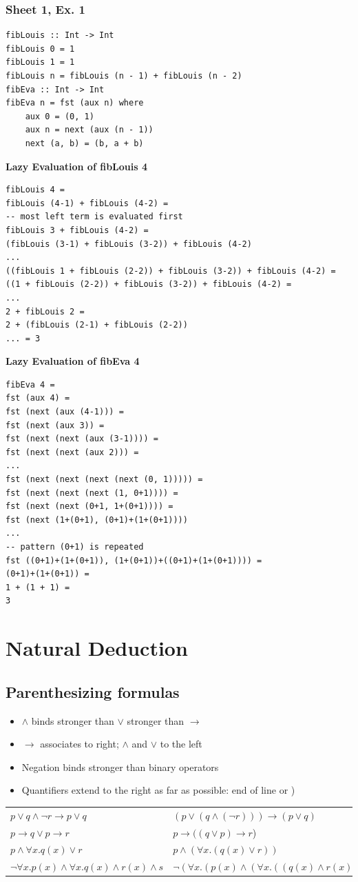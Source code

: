 \documentclass{article}
\def\li{\rightarrow}
\def\fax{\forall x.}
\begin{document}
\subsubsection{Sheet 1, Ex. 1}
\begin{verbatim}
fibLouis :: Int -> Int
fibLouis 0 = 1
fibLouis 1 = 1
fibLouis n = fibLouis (n - 1) + fibLouis (n - 2)
fibEva :: Int -> Int
fibEva n = fst (aux n) where 
    aux 0 = (0, 1)
    aux n = next (aux (n - 1))
    next (a, b) = (b, a + b)
\end{verbatim}
\textbf{Lazy Evaluation of fibLouis 4}
\begin{verbatim}
fibLouis 4 =
fibLouis (4-1) + fibLouis (4-2) =
-- most left term is evaluated first
fibLouis 3 + fibLouis (4-2) =
(fibLouis (3-1) + fibLouis (3-2)) + fibLouis (4-2) 
...
((fibLouis 1 + fibLouis (2-2)) + fibLouis (3-2)) + fibLouis (4-2) =
((1 + fibLouis (2-2)) + fibLouis (3-2)) + fibLouis (4-2) =
...
2 + fibLouis 2 =
2 + (fibLouis (2-1) + fibLouis (2-2))
... = 3
\end{verbatim}
\textbf{Lazy Evaluation of fibEva 4}
\begin{verbatim}
fibEva 4 =
fst (aux 4) =
fst (next (aux (4-1))) =
fst (next (aux 3)) =
fst (next (next (aux (3-1)))) =
fst (next (next (aux 2))) =
...
fst (next (next (next (next (0, 1))))) =
fst (next (next (next (1, 0+1)))) =
fst (next (next (0+1, 1+(0+1)))) =
fst (next (1+(0+1), (0+1)+(1+(0+1)))) 
...
-- pattern (0+1) is repeated
fst ((0+1)+(1+(0+1)), (1+(0+1))+((0+1)+(1+(0+1)))) =
(0+1)+(1+(0+1)) =
1 + (1 + 1) =
3
\end{verbatim}

\section{Natural Deduction}
\subsection{Parenthesizing formulas} 
\begin{itemize}
    \item $\land$ binds stronger than $\lor$ stronger than $\li$
    \item $\li$ associates to right; $\land$ and $\lor$ to the left
    \item Negation binds stronger than binary operators 
    \item Quantifiers extend to the right as far as possible: end of line or )
\end{itemize}
\begin{tabular}{l l}
    $p \lor q \land \lnot r \li p \lor q$ & $(p \lor (q \land (\lnot r))) \li (p \lor q)$ \\
    $p \li q \lor p \li r$ & $p \li ((q \lor p) \li r$) \\
    $p \land \fax q(x) \lor r$ & $p \land (\fax (q(x) \lor r))$ \\
    $\lnot \fax p(x) \land \fax q(x) \land r(x) \land s$ &  $\lnot( \fax (p(x) \land (\fax ((q(x) \land r(x)) \land s))))$
\end{tabular} 
\end{document}
